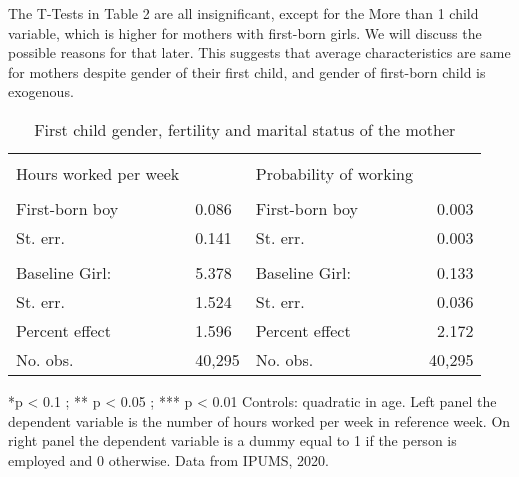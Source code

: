 \documentclass[12pt,draft,a4paper]{article}
\begin{document}
The T-Tests in Table 2 are all insignificant, except for the More than 1 child variable, which is higher for mothers with first-born girls.
We will discuss the possible reasons for that later.
This suggests that average characteristics are same for mothers despite gender of their first child, and gender of first-born child is exogenous.

\begin{table}[tbp]%
    \caption{First child gender, fertility and marital status of the mother}

    
    \begin{tabularx}{\textwidth}{lXlr}
    
    \hline & \\[-1.0em]
    Hours worked per week & & Probability of working &  \\
    \hline & \\[-1.0em]
        First-born boy          & 0.086           & First-born boy           & 0.003           \\
        St. err.                & 0.141           & St. err.                 & 0.003           \\
        \\[-1.0em]
        Baseline Girl:          & 5.378           & Baseline Girl:           & 0.133           \\
        St. err.                & 1.524           & St. err.                 & 0.036           \\
        Percent effect          & 1.596           & Percent effect           & 2.172           \\
        No. obs.                & 40,295          & No. obs.                 & 40,295          \\
    \hline
    \end{tabularx}

    *p < 0.1 ; ** p < 0.05 ; *** p < 0.01 Controls: quadratic in age. Left panel the dependent variable is the number of hours worked per week in reference week. 
    On right panel the dependent variable is a dummy equal to 1 if the person is employed and 0 otherwise. Data from IPUMS, 2020. 
    \label{tab:work}
    \end{table}
\end{document}
